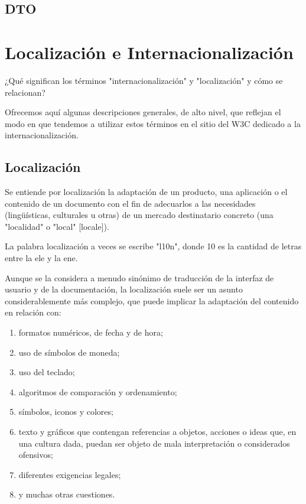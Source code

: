 \begin{enumerate}
\subsection{DTO}

\section{Localización e Internacionalización}

\cite{w3}¿Qué significan los términos "internacionalización" y "localización" y cómo se relacionan?

Ofrecemos aquí algunas descripciones generales, de alto nivel, que reflejan el modo en que tendemos a utilizar estos términos en el sitio del W3C dedicado a la internacionalización.

\subsection{Localización}

Se entiende por localización la adaptación de un producto, una aplicación o el contenido de un documento con el fin de adecuarlos a las necesidades (lingüísticas, culturales u otras) de un mercado destinatario concreto (una "localidad" o "local" [locale]).

\begin{remark}
	La palabra localización a veces se escribe "l10n", donde 10 es la cantidad de letras entre la ele y la ene.
\end{remark}


Aunque se la considera a menudo sinónimo de traducción de la interfaz de usuario y de la documentación, la localización suele ser un asunto considerablemente más complejo, que puede implicar la adaptación del contenido en relación con:

\begin{enumerate}
	\item formatos numéricos, de fecha y de hora;
	\item uso de símbolos de moneda;
	\item uso del teclado;
	\item algoritmos de comparación y ordenamiento;
	\item símbolos, iconos y colores;
	\item texto y gráficos que contengan referencias a objetos, acciones o ideas que, en una cultura dada, puedan ser objeto de mala interpretación o considerados ofensivos;
	\item diferentes exigencias legales;
	\item y muchas otras cuestiones.
\end{enumerate}


\end{enumerate}
